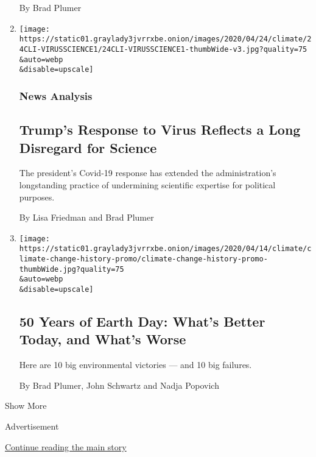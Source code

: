 \begin{enumerate}
  By Brad Plumer
\item
  \href{/2020/04/28/climate/trump-coronavirus-climate-science.html}{}

  \texttt{[image: https://static01.graylady3jvrrxbe.onion/images/2020/04/24/climate/24CLI-VIRUSSCIENCE1/24CLI-VIRUSSCIENCE1-thumbWide-v3.jpg?quality=75\\\&auto=webp\\\&disable=upscale]}

  \hypertarget{news-analysis}{%
  \subsubsection{News Analysis}\label{news-analysis}}

  \hypertarget{trumps-response-to-virus-reflects-a-long-disregard-for-science}{%
  \subsection{Trump's Response to Virus Reflects a Long Disregard for
  Science}\label{trumps-response-to-virus-reflects-a-long-disregard-for-science}}

  The president's Covid-19 response has extended the administration's
  longstanding practice of undermining scientific expertise for
  political purposes.

  By Lisa Friedman and Brad Plumer
\item
  \href{/interactive/2020/climate/earth-day-history.html}{}

  \texttt{[image: https://static01.graylady3jvrrxbe.onion/images/2020/04/14/climate/climate-change-history-promo/climate-change-history-promo-thumbWide.jpg?quality=75\\\&auto=webp\\\&disable=upscale]}

  \hypertarget{50-years-of-earth-day-whats-better-today-and-whats-worse}{%
  \subsection{50 Years of Earth Day: What's Better Today, and What's
  Worse}\label{50-years-of-earth-day-whats-better-today-and-whats-worse}}

  Here are 10 big environmental victories --- and 10 big failures.

  By Brad Plumer, John Schwartz and Nadja Popovich
\end{enumerate}

Show More

Advertisement

\protect\hyperlink{after-mid2}{Continue reading the main story}

